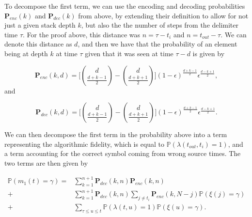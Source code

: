 \documentclass{article}
\newcommand{\eps}{\epsilon}
\begin{document}
To decompose the first term, we can use the encoding and decoding probabilities $\mathbf{P}_{enc}(k)$ and $\mathbf{P}_{dec}(k)$ from above, by extending their definition to allow for not just a given stack depth $k$, but also the the number of steps from the delimiter time $\tau$. For the proof above, this distance was $n= \tau-t_i$ and $n = t_{out}-\tau$. We can denote this distance as $d$, and then we have that the probability of an element being at depth $k$ at time $\tau$ given that it was seen at time $\tau-d$ is given by

$$
\mathbf{P}_{enc}(k,d) = \bigg[\binom{d}{\frac{d+k-1}{2}} - \binom{d}{\frac{d+k+1}{2}}\bigg] (1- \eps)^{\frac{d + k-1}{2}} \eps^{\frac{d-k+1}{2}},
$$
and 

$$
\mathbf{P}_{dec}(k, d) = \bigg[\binom{d}{\frac{d+k-1}{2}} - \binom{d}{\frac{d+k+1}{2}}\bigg] (1- \eps)^{\frac{d + k-1}{2}} \eps^{\frac{d-k+1}{2}}.
$$

We can then decompose the first term in the probability above into a term representing the algorithmic fidelity, which is equal to $\mathbb{P}(\lambda(t_{out},t_{i}) = 1)$, and a term accounting for the correct symbol coming from wrong source times. The two terms are then given by

\begin{align*}
\mathbb{P}(m_1(t) = \gamma) = &\sum_{k=1}^{n+1} \mathbf{P}_{dec}(k, n) \mathbf{P}_{enc}(k, n) \\ 
+ &\sum_{k=1}^{n+1} \mathbf{P}_{dec}(k, n) \sum_{j \neq t_i} \mathbf{P}_{enc}(k, N-j) \mathbb{P}(\xi(j) = \gamma) \\ 
+ &\sum_{\tau \leq u \leq t}\mathbb{P}(\lambda(t,u) = 1)\mathbb{P}(\xi(u) = \gamma).
\end{align*}
\end{document}
